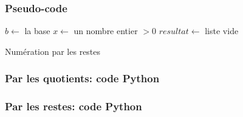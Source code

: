 \begin{frame}
 \frametitle{Pseudo-code}
\begin{algorithm}[H]
 $b \leftarrow $ la base \;
 $x \leftarrow $ un nombre entier $>0$ \;
 $resultat \leftarrow$ liste vide \;
 \caption{Numération par les restes}
\end{algorithm}
\end{frame}

\begin{frame}
 \frametitle{Par les quotients: code Python}

\end{frame}

\begin{frame}
 \frametitle{Par les restes: code Python}

\end{frame}




